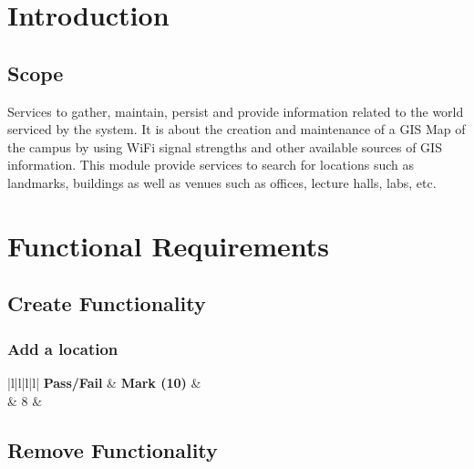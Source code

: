 \documentclass[runningheads,a4paper]{article}
\newcommand{\cmark}{\ding{51}}%
\begin{document}
\begingroup

\tableofcontents
{}
\endgroup
\newpage

\section{Introduction}

\subsection{Scope}
Services to gather, maintain, persist and provide information related to the world
serviced by the system. It is about the creation and maintenance of a GIS Map of the
campus by using WiFi signal strengths and other available sources of GIS
information.
This module provide services to search for locations such as landmarks, buildings as
well as venues such as offices, lecture halls, labs, etc.
 
\section{Functional Requirements}
\subsection{Create Functionality}
\subsubsection{Add a location}

\label{my-label}
\begin{tabular}{|l|l|l|l|}
	\hline
	\textbf{Pass/Fail} & \textbf{Mark (10)} &                                                                                                                                                               \\ 
	\hline
	\cmark  &   8  &  \\ \hline
\end{tabular}

\subsection{Remove Functionality}
\end{document}
